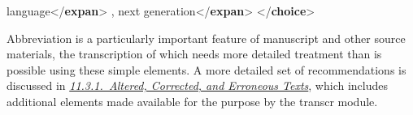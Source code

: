 \begin{shaded}
\hspace*{1em}\hspace*{1em}\hspace*{1em}\hspace*{1em}\hspace*{1em}\hspace*{1em} language{</\textbf{expan}>}\mbox{}\newline 
\hspace*{1em}, next\mbox{}\newline 
\hspace*{1em}\hspace*{1em} generation{</\textbf{expan}>}\mbox{}\newline 
{</\textbf{choice}>}\end{shaded}\egroup\par \par
Abbreviation is a particularly important feature of manuscript and other source materials, the transcription of which needs more detailed treatment than is possible using these simple elements. A more detailed set of recommendations is discussed in \textit{\hyperref[PHCH]{11.3.1.\ Altered, Corrected, and Erroneous Texts}}, which includes additional elements made available for the purpose by the \textsf{transcr} module.
